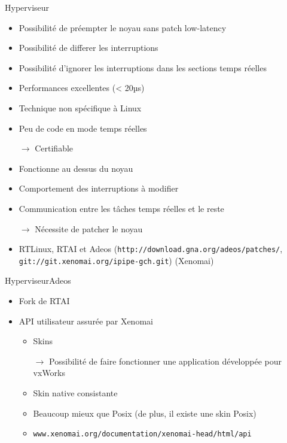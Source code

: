 \begin{frame}[fagile]{Hyperviseur}
  \begin{itemize}
   \item Possibilité de préempter le noyau sans patch low-latency
   \item Possibilité de differer les interruptions
   \item Possibilité d'ignorer les interruptions dans les sections temps réelles
   \item Performances excellentes (< 20µs)
   \item Technique non spécifique à Linux
   \item Peu de code en mode temps réelles
   \item[$\to$] Certifiable

   \item Fonctionne au dessus du noyau
   \item Comportement des interruptions à modifier
   \item Communication entre les tâches temps réelles et le reste
   \item[$\to$] Nécessite de patcher le noyau
   
   \item RTLinux, RTAI et Adeos (\texttt{http://download.gna.org/adeos/patches/}, \texttt{git://git.xenomai.org/ipipe-gch.git}) (Xenomai)
  \end{itemize}
\end{frame}

\begin{frame}{Hyperviseur}{Adeos}
  \begin{itemize}
    \item Fork de RTAI
    \item API utilisateur assurée par Xenomai
    \begin{itemize}
      \item Skins 
      \item[$\to$] Possibilité de faire fonctionner une application développée pour vxWorks
      \item Skin native consistante
      \item Beaucoup mieux que Posix (de plus, il existe une skin Posix)
      \item \texttt{www.xenomai.org/documentation/xenomai-head/html/api}
    \end{itemize}
  \end{itemize}
\end{frame}

